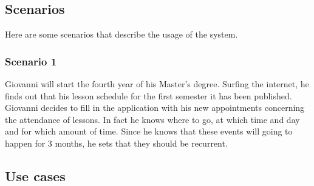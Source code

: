 \subsection{Scenarios}
Here are some scenarios that describe the usage of the system.
\subsubsection{Scenario 1} \label{scenario:1}
Giovanni will start the fourth year of his Master's degree. Surfing the internet, he finds out that his lesson schedule for the first semester it has been published. Giovanni decides to fill in the application with his new appointments concerning the attendance of lessons. In fact he knows where to go, at which time and day and for which amount of time. Since he knows that these events will going to happen for 3 months, he sets that they should be recurrent.

\subsection{Use cases}

